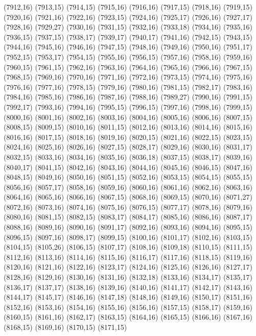(7912,16)
(7913,15)
(7914,15)
(7915,16)
(7916,16)
(7917,15)
(7918,16)
(7919,15)
(7920,16)
(7921,16)
(7922,16)
(7923,15)
(7924,16)
(7925,17)
(7926,16)
(7927,17)
(7928,16)
(7929,27)
(7930,16)
(7931,15)
(7932,16)
(7933,18)
(7934,16)
(7935,16)
(7936,15)
(7937,15)
(7938,17)
(7939,17)
(7940,17)
(7941,16)
(7942,15)
(7943,15)
(7944,16)
(7945,16)
(7946,16)
(7947,15)
(7948,16)
(7949,16)
(7950,16)
(7951,17)
(7952,15)
(7953,17)
(7954,15)
(7955,16)
(7956,15)
(7957,16)
(7958,16)
(7959,16)
(7960,15)
(7961,15)
(7962,16)
(7963,16)
(7964,16)
(7965,16)
(7966,16)
(7967,15)
(7968,15)
(7969,16)
(7970,16)
(7971,16)
(7972,16)
(7973,15)
(7974,16)
(7975,16)
(7976,16)
(7977,16)
(7978,15)
(7979,16)
(7980,16)
(7981,15)
(7982,17)
(7983,16)
(7984,16)
(7985,16)
(7986,16)
(7987,16)
(7988,16)
(7989,27)
(7990,16)
(7991,15)
(7992,17)
(7993,16)
(7994,16)
(7995,15)
(7996,15)
(7997,16)
(7998,16)
(7999,15)
(8000,16)
(8001,16)
(8002,16)
(8003,16)
(8004,16)
(8005,16)
(8006,16)
(8007,15)
(8008,15)
(8009,15)
(8010,16)
(8011,15)
(8012,16)
(8013,16)
(8014,16)
(8015,16)
(8016,16)
(8017,15)
(8018,16)
(8019,16)
(8020,15)
(8021,16)
(8022,15)
(8023,15)
(8024,16)
(8025,16)
(8026,16)
(8027,15)
(8028,17)
(8029,16)
(8030,16)
(8031,17)
(8032,15)
(8033,16)
(8034,16)
(8035,16)
(8036,18)
(8037,15)
(8038,17)
(8039,16)
(8040,17)
(8041,15)
(8042,16)
(8043,16)
(8044,16)
(8045,16)
(8046,15)
(8047,16)
(8048,15)
(8049,16)
(8050,16)
(8051,15)
(8052,16)
(8053,15)
(8054,15)
(8055,15)
(8056,16)
(8057,17)
(8058,16)
(8059,16)
(8060,16)
(8061,16)
(8062,16)
(8063,16)
(8064,16)
(8065,16)
(8066,16)
(8067,15)
(8068,16)
(8069,15)
(8070,16)
(8071,27)
(8072,16)
(8073,16)
(8074,16)
(8075,16)
(8076,15)
(8077,17)
(8078,16)
(8079,16)
(8080,16)
(8081,15)
(8082,15)
(8083,17)
(8084,17)
(8085,16)
(8086,16)
(8087,17)
(8088,16)
(8089,16)
(8090,16)
(8091,17)
(8092,16)
(8093,16)
(8094,16)
(8095,15)
(8096,15)
(8097,16)
(8098,17)
(8099,15)
(8100,16)
(8101,17)
(8102,16)
(8103,15)
(8104,15)
(8105,26)
(8106,15)
(8107,17)
(8108,16)
(8109,18)
(8110,15)
(8111,15)
(8112,16)
(8113,16)
(8114,16)
(8115,16)
(8116,17)
(8117,16)
(8118,15)
(8119,16)
(8120,16)
(8121,16)
(8122,16)
(8123,17)
(8124,16)
(8125,16)
(8126,16)
(8127,17)
(8128,16)
(8129,16)
(8130,16)
(8131,16)
(8132,18)
(8133,16)
(8134,17)
(8135,17)
(8136,17)
(8137,17)
(8138,16)
(8139,16)
(8140,16)
(8141,17)
(8142,17)
(8143,16)
(8144,17)
(8145,17)
(8146,16)
(8147,18)
(8148,16)
(8149,16)
(8150,17)
(8151,16)
(8152,16)
(8153,16)
(8154,16)
(8155,16)
(8156,16)
(8157,15)
(8158,17)
(8159,16)
(8160,15)
(8161,16)
(8162,17)
(8163,15)
(8164,16)
(8165,15)
(8166,16)
(8167,16)
(8168,15)
(8169,16)
(8170,15)
(8171,15)
